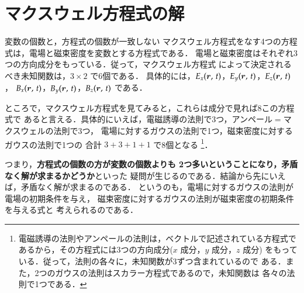     \section{マクスウェル方程式の解}
    \begin{mysmallsec}{変数の個数と，方程式の個数が一致しない}
        マクスウェル方程式をなす4つの方程式は，電場と磁束密度を変数とする方程式である．
        電場と磁束密度はそれぞれ3つの方向成分をもっている．従って，マクスウェル方程式
        によって決定されるべき未知関数は，$3\times2$ で6個である．
        具体的には，$E_{x}(\boldsymbol{r},\,t)$，$E_{y}(\boldsymbol{r},\,t)$，$E_{z}(\boldsymbol{r},\,t)$，
        $B_{x}(\boldsymbol{r},\,t)$，$B_{y}(\boldsymbol{r},\,t)$，$B_{z}(\boldsymbol{r},\,t)$ である．

        ところで，マクスウェル方程式を見てみると，これらは成分で見れば8この方程式で
        あると言える．具体的にいえば，電磁誘導の法則で3つ，アンペール$=$マクスウェルの法則で3つ，
        電場に対するガウスの法則で1つ，磁束密度に対するガウスの法則で1つの
        合計 $3+3+1+1$ で8個となる
            \footnote{
                電磁誘導の法則やアンペールの法則は，ベクトルで記述されている方程式で
                あるから，その方程式には3つの方向成分($x$ 成分，$y$ 成分，$z$ 成分)
                をもっている．従って，法則の各々に，未知関数が3ずつ含まれているので
                ある．また，2つのガウスの法則はスカラー方程式であるので，未知関数は
                各々の法則で1つである．
            }．

        つまり，\textbf{方程式の個数の方が変数の個数よりも
        2つ多いということになり，矛盾なく解が求まるかどうか}といった
        疑問が生じるのである．結論から先にいえば，矛盾なく解が求まるのである．
        というのも，電場に対するガウスの法則が電場の初期条件を与え，
        磁束密度に対するガウスの法則が磁束密度の初期条件を与える式と
        考えられるのである．
    \end{mysmallsec}

